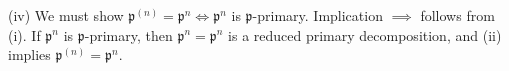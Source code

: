 \documentclass[12pt,letterpaper]{article}%
\newcommand{\mf}{\mathfrak}
\newcommand{\ppp}{\mf p}
\newcommand{\qqq}{\mf q}
\newcommand{\nn}{\noindent}
\begin{document}
\begin{comment}
\nn(i') $\ppp^{(n)}$ is the smallest $\ppp$-primary ideal containing $\ppp^n$. Proof: assuming $\ppp^n\subset\qqq\subset\ppp$ with $\qqq$ a $\ppp$-primary ideal, we get $\ppp^n_\ppp\subset\qqq_\ppp\subset\ppp_\ppp$, and thus $\ppp^{(n)}\subset\qqq\subset\ppp$.

\nn(ii) Let $\ppp^n=\qqq_1\cap\cdots\cap\qqq_k$ be a reduced primary decomposition. Taking radical we get $\ppp=\ppp_1\cap\cdots\cap\ppp_k$ with $\ppp_i=r(\qqq_i)$. By Corollary~\ref{ctoc4.11}b p.~\pageref{ctoc4.11} this implies $\ppp=\ppp_i$ for some $i$, and $\ppp$ is isolated. The statement now follows from (i') and Corollary~\ref{ctoc4.11}a p.~\pageref{ctoc4.11}.

\nn(iii) We have $r(\ppp^{(m)}\ppp^{(n)})=r(\ppp^{(m)})\cap r(\ppp^{(n)})=\ppp$ by (i). Let $\ppp^{(m)}\ppp^{(n)}=\qqq_1\cap\cdots\cap\qqq_k$ be a reduced primary decomposition. Taking radical we get $\ppp=\ppp_1\cap\cdots\cap\ppp_k$ with $\ppp_i=r(\qqq_i)$. By Corollary~\ref{ctoc4.11}b p.~\pageref{ctoc4.11} this implies $\ppp=\ppp_i$ for some $i$, and $\ppp$ is isolated. The statement follows again from (i') and Corollary~\ref{ctoc4.11}a p.~\pageref{ctoc4.11}.
\end{comment}

\nn(iv) We must show $\ppp^{(n)}=\ppp^n\iff\ppp^n$ is $\ppp$-primary. Implication $\implies$ follows from (i). If $\ppp^n$ is $\ppp$-primary, then $\ppp^n=\ppp^n$ is a reduced primary decomposition, and (ii) implies $\ppp^{(n)}=\ppp^n$.
\end{document}
